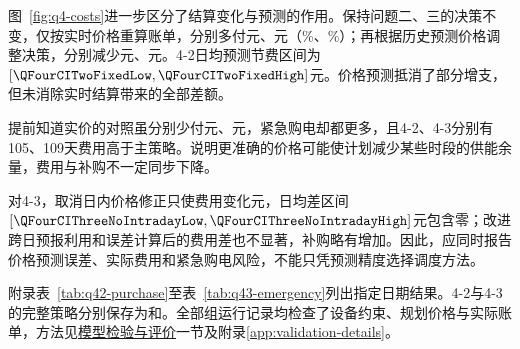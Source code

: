 图~\ref{fig:q4-costs}进一步区分了结算变化与预测的作用。保持问题二、三的决策不变，仅按实时价格重算账单，分别多付\QFourTwoSettlementEffect 元、\QFourThreeSettlementEffect 元（\QFourTwoSettlementPercent\%、\QFourThreeSettlementPercent\%）；再根据历史预测价格调整决策，分别减少\QFourTwoFixedDiff 元、\QFourThreeFixedDiff 元。4-2日均预测节费区间为$[\QFourCITwoFixedLow,\QFourCITwoFixedHigh]$元。价格预测抵消了部分增支，但未消除实时结算带来的全部差额。

提前知道实价的对照虽分别少付\QFourTwoPerfectGap 元、\QFourThreePerfectGap 元，紧急购电却都更多，且4-2、4-3分别有105、109天费用高于主策略。说明更准确的价格可能使计划减少某些时段的供能余量，费用与补购不一定同步下降。\par 对4-3，取消日内价格修正只使费用变化\QFourThreeNoIntradayDiff 元，日均差区间$[\QFourCIThreeNoIntradayLow,\QFourCIThreeNoIntradayHigh]$元包含零；改进跨日预报利用和误差计算后的费用差也不显著，补购略有增加。因此，应同时报告价格预测误差、实际费用和紧急购电风险，不能只凭预测精度选择调度方法。

附录表~\ref{tab:q42-purchase}至表~\ref{tab:q43-emergency}列出指定日期结果。4-2与4-3的完整策略分别保存为和。全部\QFourStrategyCount 组运行记录均检查了设备约束、规划价格与实际账单，方法见\hyperref[sec:model-validation]{模型检验与评价}一节及附录\ref{app:validation-details}。
